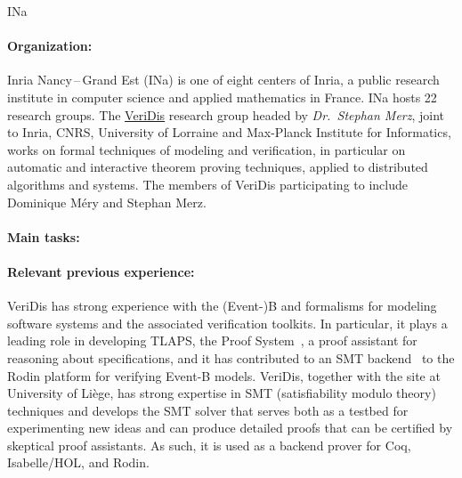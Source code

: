 \begin{sitedescription}{INa}

\paragraph{Organization:}

Inria Nancy\,--\,Grand Est (INa) is one of eight centers of Inria, a public
research institute in computer science and applied mathematics in France. INa
hosts 22 research groups. The \href{https://team.inria.fr/veridis/}{VeriDis}
research group headed by \emph{Dr.\ Stephan Merz}, joint to Inria, CNRS,
University of Lorraine and Max-Planck Institute for Informatics, works on formal
techniques of modeling and verification, in particular on automatic and
interactive theorem proving techniques, applied to distributed algorithms and
systems. The members of VeriDis participating to \pn include Dominique M\'ery
and Stephan Merz.

\paragraph{Main tasks:}

\begin{compactitem}
\item{} 
\end{compactitem}


\paragraph{Relevant previous experience:}

VeriDis has strong experience with the (Event-)B and \tlaplus formalisms for
modeling software systems and the associated verification toolkits. In
particular, it plays a leading role in developing TLAPS, the \tlaplus Proof
System~\cite{cousineau:tla-proofs}, a proof assistant for reasoning about
\tlaplus specifications, and it has contributed to an SMT
backend~\cite{deharbe:smt-rodin} to the Rodin platform for verifying Event-B
models. VeriDis, together with the site at University of Liège, has strong
expertise in SMT (satisfiability modulo theory) techniques and develops the SMT
solver \veriT that serves both as a testbed for experimenting new ideas and can
produce detailed proofs that can be certified by skeptical proof assistants. As
such, it is used as a backend prover for Coq, Isabelle/HOL, and Rodin.


\end{sitedescription}
